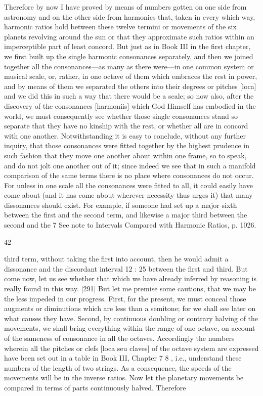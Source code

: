 \documentclass{article}
\begin{document}
Therefore by now I have proved by means of numbers gotten on one side
from astronomy and on the other side from harmonics that, taken in
every which way, harmonic ratios hold between these twelve termini or
movements of the six planets revolving around the sun or that they
approximate such ratios within an imperceptible part of least concord.
But just as in Book III in the first chapter, we first built up the single
harmonic consonances separately, and then we joined together all the
consonances—as many as there were—in one common system or musical
scale, or, rather, in one octave of them which embraces the rest in power,
and by means of them we separated the others into their degrees or
pitches [loca] and we did this in such a way that there would be a scale;
so now also, after the discovery of the consonances [harmoniis] which
God Himself has embodied in the world, we must consequently see
whether those single consonances stand so separate that they have no
kinship with the rest, or whether all are in concord with one another.
Notwithstanding it is easy to conclude, without any further inquiry, that
those consonances were fitted together by the highest prudence in such
fashion that they move one another about within one frame, so to speak,
and do not jolt one another out of it; since indeed we see that in such a
manifold comparison of the same terms there is no place where
consonances do not occur. For unless in one scale all the consonances
were fitted to all, it could easily have come about (and it has come about
wherever necessity thus urges it) that many dissonances should exist.
For example, if someone had set up a major sixth between the first and
the second term, and likewise a major third between the second and the
7 See note to Intervals Compared with Harmonic Ratios, p. 1026.


42

third term, without taking the first into account, then he would admit a
dissonance and the discordant interval 12 : 25 between the first and
third.
But come now, let us see whether that which we have already inferred by
reasoning is really found in this way. [291] But let me premise some
cautions, that we may be the less impeded in our progress. First, for the
present, we must conceal those augments or diminutions which are less
than a semitone; for we shall see later on what causes they have. Second,
by continuous doubling or contrary halving of the movements, we shall
bring everything within the range of one octave, on account of the
sameness of consonance in all the octaves.
Accordingly the numbers wherein all the pitches or clefs [loca seu
claves] of the octave system are expressed have been set out in a table in
Book III, Chapter 7 8 , i.e., understand these numbers of the length of
two strings. As a consequence, the speeds of the movements will be in
the inverse ratios.
Now let the planetary movements be compared in terms of parts
continuously halved. Therefore
\end{document}
